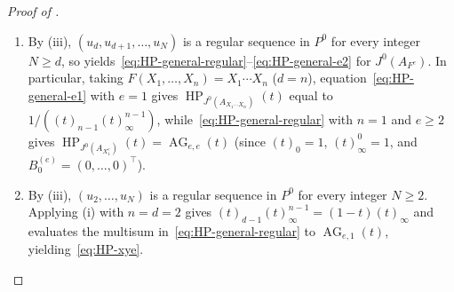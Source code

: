 \documentclass[a4paper, 12pt, reqno]{amsart}
\theoremstyle{remark}
\begin{document}
\begin{proof}[Proof of ]
  \begin{enumerate}
  \item By (iii),
    $(u_d, u_{d + 1}, \dots, u_N)$ is a regular sequence in $P^0$ for every integer $N \ge d$,
    so  yields~\eqref{eq:HP-general-regular}--\eqref{eq:HP-general-e2} for $J^0(A_{F^e})$.
    In particular,
    taking $F(X_1, \dots, X_n) = X_1 \cdots X_n$ ($d = n$),
    equation~\eqref{eq:HP-general-e1} with $e = 1$ gives $\operatorname{HP}_{J^0(A_{X_1 \cdots X_n})}(t)$ equal to $1 / ((t)_{n - 1}(t)_\infty^{n - 1})$,
    while~\eqref{eq:HP-general-regular} with $n = 1$ and $e \ge 2$ gives $\operatorname{HP}_{J^0(A_{X_1^e})}(t) = \operatorname{AG}_{e, e}(t)$
    (since $(t)_0 = 1$, $(t)_\infty^0 = 1$, and $B^{(e)}_0 = (0, \dots, 0)^\top$).
  \item By (iii),
    $(u_2, \dots, u_N)$ is a regular sequence in $P^0$ for every integer $N \ge 2$.
    Applying (i) with $n = d = 2$ gives $(t)_{d - 1}(t)_\infty^{n - 1} = (1 - t)(t)_\infty$ and evaluates the multisum in~\eqref{eq:HP-general-regular} to $\operatorname{AG}_{e, 1}(t)$,
    yielding~\eqref{eq:HP-xye}.\qedhere
  \end{enumerate}
\end{proof}
\end{document}
